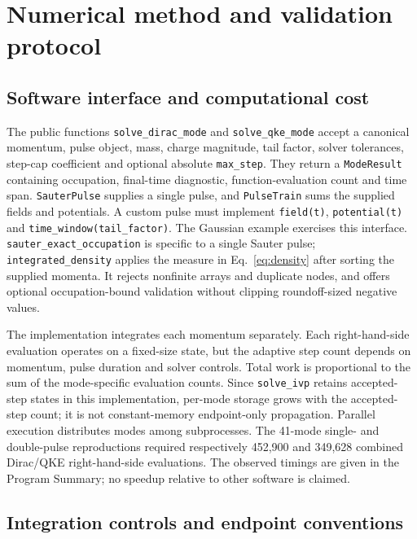 \documentclass[11pt,a4paper]{article}
\begin{document}
\section{Numerical method and validation protocol}
\label{sec:software}

\subsection{Software interface and computational cost}

The public functions \texttt{solve\_dirac\_mode} and \texttt{solve\_qke\_mode} accept a canonical momentum, pulse object, mass, charge magnitude, tail factor, solver tolerances, step-cap coefficient and optional absolute \texttt{max\_step}. They return a \texttt{ModeResult} containing occupation, final-time diagnostic, function-evaluation count and time span. \texttt{SauterPulse} supplies a single pulse, and \texttt{PulseTrain} sums the supplied fields and potentials. A custom pulse must implement \texttt{field(t)}, \texttt{potential(t)} and \texttt{time\_window(tail\_factor)}. The Gaussian example exercises this interface. \texttt{sauter\_exact\_occupation} is specific to a single Sauter pulse; \texttt{integrated\_density} applies the measure in Eq.~\eqref{eq:density} after sorting the supplied momenta. It rejects nonfinite arrays and duplicate nodes, and offers optional occupation-bound validation without clipping roundoff-sized negative values.

The implementation integrates each momentum separately. Each right-hand-side evaluation operates on a fixed-size state, but the adaptive step count depends on momentum, pulse duration and solver controls. Total work is proportional to the sum of the mode-specific evaluation counts. Since \texttt{solve\_ivp} retains accepted-step states in this implementation, per-mode storage grows with the accepted-step count; it is not constant-memory endpoint-only propagation. Parallel execution distributes modes among subprocesses. The 41-mode single- and double-pulse reproductions required respectively 452,900 and 349,628 combined Dirac/QKE right-hand-side evaluations. The observed timings are given in the Program Summary; no speedup relative to other software is claimed.

\subsection{Integration controls and endpoint conventions}
\end{document}
